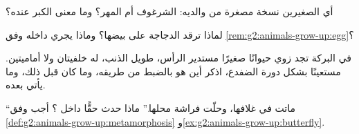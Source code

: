 \begin{exercise}[$\star$]\label{exo:g2:animals-grow-up:7}
أي الصغيرين نسخة مصغرة من والديه: الشرغوف أم المهر؟ وما معنى
الكبر عنده؟
\end{exercise}

\begin{exercise}[$\star$]\label{exo:g2:animals-grow-up:8}
لماذا ترقد الدجاجة على بيضها؟ وماذا يجري داخله وفق
\cref{rem:g2:animals-grow-up:egg}؟
\end{exercise}

\begin{exercise}[$\star\star$]\label{exo:g2:animals-grow-up:9}
في البركة تجد زوي حيوانًا صغيرًا مستدير الرأس، طويل الذنب، له
 خلفيتان ولا  أماميتين. مستعينًا بشكل دورة الضفدع، اذكر
أين هو بالضبط من طريقه، وما كان قبل ذلك، وما يأتي بعده.
\end{exercise}

\begin{exercise}[$\star\star$]\label{exo:g2:animals-grow-up:10}
``ماتت  في غلافها، وحلّت فراشة محلها.'' ماذا حدث حقًّا داخل
؟ أجب وفق \cref{def:g2:animals-grow-up:metamorphosis}
و\cref{ex:g2:animals-grow-up:butterfly}.
\end{exercise}
